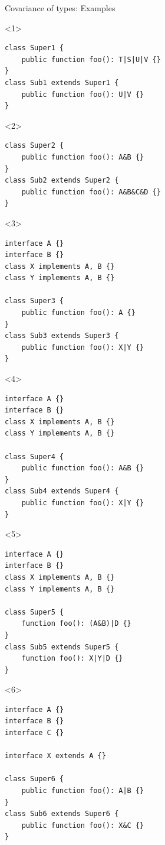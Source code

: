 \documentclass[aspectratio=169]{beamer}
\begin{document}
\begin{frame}[fragile]{Covariance of types: Examples}
    \begin{onlyenv}<1>
        \begin{verbatim}
class Super1 {
    public function foo(): T|S|U|V {}
}
class Sub1 extends Super1 {
    public function foo(): U|V {}
}
        \end{verbatim}
    \end{onlyenv}
    \begin{onlyenv}<2>
        \begin{verbatim}
class Super2 {
    public function foo(): A&B {}
}
class Sub2 extends Super2 {
    public function foo(): A&B&C&D {}
}
        \end{verbatim}
    \end{onlyenv}
    \begin{onlyenv}<3>
        \begin{verbatim}
interface A {}
interface B {}
class X implements A, B {}
class Y implements A, B {}

class Super3 {
    public function foo(): A {}
}
class Sub3 extends Super3 {
    public function foo(): X|Y {}
}
        \end{verbatim}
    \end{onlyenv}
    \begin{onlyenv}<4>
        \begin{verbatim}
interface A {}
interface B {}
class X implements A, B {}
class Y implements A, B {}

class Super4 {
    public function foo(): A&B {}
}
class Sub4 extends Super4 {
    public function foo(): X|Y {}
}
        \end{verbatim}
    \end{onlyenv}
    \begin{onlyenv}<5>
        \begin{verbatim}
interface A {}
interface B {}
class X implements A, B {}
class Y implements A, B {}

class Super5 {
    function foo(): (A&B)|D {}
}
class Sub5 extends Super5 {
    function foo(): X|Y|D {}
}
        \end{verbatim}
    \end{onlyenv}
    \begin{onlyenv}<6>
        \begin{verbatim}
interface A {}
interface B {}
interface C {}

interface X extends A {}

class Super6 {
    public function foo(): A|B {}
}
class Sub6 extends Super6 {
    public function foo(): X&C {}
}
        \end{verbatim}
    \end{onlyenv}
\end{frame}
\end{document}
